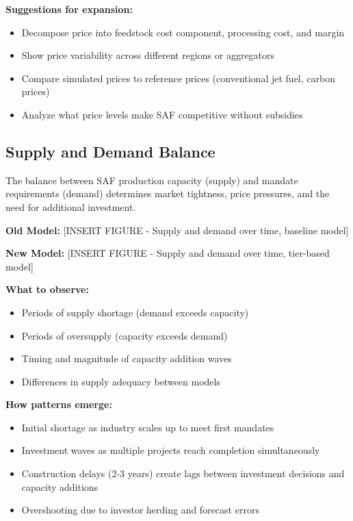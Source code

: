 \documentclass[10.5pt]{article}
\begin{document}
\textbf{Suggestions for expansion:}
\begin{itemize}
    \item Decompose price into feedstock cost component, processing cost, and margin
    \item Show price variability across different regions or aggregators
    \item Compare simulated prices to reference prices (conventional jet fuel, carbon prices)
    \item Analyze what price levels make SAF competitive without subsidies
\end{itemize}

\subsection{Supply and Demand Balance}

The balance between SAF production capacity (supply) and mandate requirements (demand) determines market tightness, price pressures, and the need for additional investment.

\textbf{Old Model:} [INSERT FIGURE - Supply and demand over time, baseline model]

\textbf{New Model:} [INSERT FIGURE - Supply and demand over time, tier-based model]

\textbf{What to observe:}
\begin{itemize}
    \item Periods of supply shortage (demand exceeds capacity)
    \item Periods of oversupply (capacity exceeds demand)
    \item Timing and magnitude of capacity addition waves
    \item Differences in supply adequacy between models
\end{itemize}

\textbf{How patterns emerge:}
\begin{itemize}
    \item Initial shortage as industry scales up to meet first mandates
    \item Investment waves as multiple projects reach completion simultaneously
    \item Construction delays (2-3 years) create lags between investment decisions and capacity additions
    \item Overshooting due to investor herding and forecast errors
\end{itemize}
\end{document}

